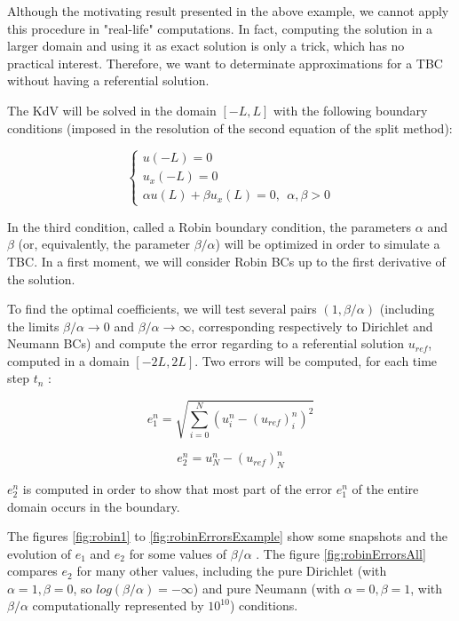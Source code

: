 \indent Although the motivating result presented in the above example, we cannot apply this procedure in "real-life" computations. In fact, computing the solution in a larger domain and using it as exact solution is only a trick, which has no practical interest. Therefore, we want to determinate approximations for a TBC without having a referential solution. 

\indent The KdV will be solved in the domain $[-L,L]$ with the following boundary conditions (imposed in the resolution of the second equation of the split method):

\begin{equation}
\begin{cases}
    u(-L) = 0 \\
    u_x(-L) = 0 \\
    \alpha u(L) + \beta u_x(L) = 0,  \ \ \alpha,\beta > 0
\end{cases}
\end{equation}

\indent In the third condition, called a Robin boundary condition, the parameters $\alpha$ and $\beta$ (or, equivalently, the parameter $\beta/\alpha$) will be optimized in order to simulate a TBC. In a first moment, we will consider Robin BCs up to the first derivative of the solution.

\indent To find the optimal coefficients, we will test several pairs $(1,\beta/\alpha)$ (including the limits $\beta/\alpha \rightarrow 0$ and $\beta/\alpha \rightarrow \infty$, corresponding respectively to Dirichlet and Neumann BCs) and compute the error regarding to a referential solution $u_{ref}$, computed in a domain $[-2L,2L]$. Two errors will be computed, for each time step $t_n$ :

\begin{equation}
e_1^n = \sqrt{\sum_{i=0}^N{\left( u^n_i - (u_{ref})^n_i\right)^2}} 
\end{equation}

\begin{equation}
e_2^n =  u^n_N - (u_{ref})^n_N
\end{equation}

\indent $e_2^n$ is computed in order to show that most part of the error $e_1^n$ of the entire domain occurs in the boundary.

\indent The figures \ref{fig:robin1} to \ref{fig:robinErrorsExample} show some snapshots and the evolution of $e_1$ and $e_2$ for some values of $\beta/\alpha$ . The figure \ref{fig:robinErrorsAll} compares $e_2$ for many other values, including the pure Dirichlet (with $\alpha = 1, \beta = 0$, so $log(\beta/\alpha) = -\infty$) and pure Neumann (with $\alpha = 0, \beta = 1$, with $\beta/\alpha$ computationally represented by  $10^{10}$)  conditions.


